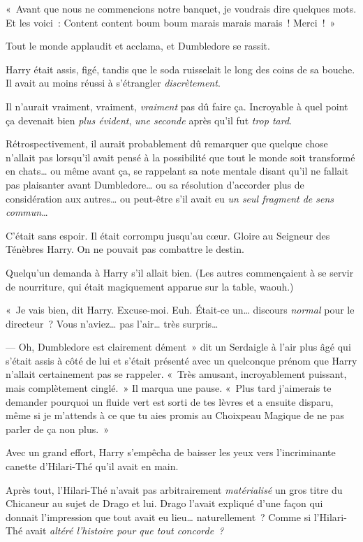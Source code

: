 «~Avant que nous ne commencions notre banquet, je voudrais dire quelques mots. Et les voici~: Content content boum boum marais marais marais~! Merci~!~»

Tout le monde applaudit et acclama, et Dumbledore se rassit.

Harry était assis, figé, tandis que le soda ruisselait le long des coins de sa bouche. Il avait au moins réussi à s'étrangler \emph{discrètement}.

Il n'aurait vraiment, vraiment, \emph{vraiment} pas dû faire ça. Incroyable à quel point ça devenait bien \emph{plus évident}, \emph{une seconde} après qu'il fut \emph{trop tard}.

Rétrospectivement, il aurait probablement dû remarquer que quelque chose n'allait pas lorsqu'il avait pensé à la possibilité que tout le monde soit transformé en chats… ou même avant ça, se rappelant sa note mentale disant qu'il ne fallait pas plaisanter avant Dumbledore… ou sa résolution d'accorder plus de considération aux autres… ou peut-être s'il avait eu \emph{un seul fragment de sens commun}…

C'était sans espoir. Il était corrompu jusqu'au cœur. Gloire au Seigneur des Ténèbres Harry. On ne pouvait pas combattre le destin.

Quelqu'un demanda à Harry s'il allait bien. (Les autres commençaient à se servir de nourriture, qui était magiquement apparue sur la table, waouh.)

«~Je vais bien, dit Harry. Excuse-moi. Euh. Était-ce un… discours \emph{normal} pour le directeur~? Vous n'aviez… pas l'air… très surpris…

--- Oh, Dumbledore est clairement dément~» dit un Serdaigle à l'air plus âgé qui s'était assis à côté de lui et s'était présenté avec un quelconque prénom que Harry n'allait certainement pas se rappeler. «~Très amusant, incroyablement puissant, mais complètement cinglé.~» Il marqua une pause. «~Plus tard j'aimerais te demander pourquoi un fluide vert est sorti de tes lèvres et a ensuite disparu, même si je m'attends à ce que tu aies promis au Choixpeau Magique de ne pas parler de ça non plus.~»

Avec un grand effort, Harry s'empêcha de baisser les yeux vers l'incriminante canette d'Hilari-Thé qu'il avait en main.

Après tout, l'Hilari-Thé n'avait pas arbitrairement \emph{matérialisé} un gros titre du Chicaneur au sujet de Drago et lui. Drago l'avait expliqué d'une façon qui donnait l'impression que tout avait eu lieu… naturellement~? Comme si l'Hilari-Thé avait \emph{altéré l'histoire pour que tout concorde~?}

